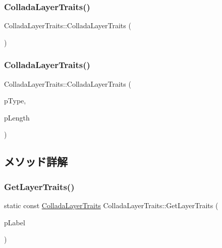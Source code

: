 \subsubsection{\texorpdfstring{Collada\+Layer\+Traits()}{ColladaLayerTraits()}\hspace{0.1cm}{\footnotesize\ttfamily [1/2]}}
{\footnotesize\ttfamily Collada\+Layer\+Traits\+::\+Collada\+Layer\+Traits (\begin{DoxyParamCaption}{ }\end{DoxyParamCaption})}

\mbox{\label{struct_collada_layer_traits_a823980f2de7a3b074c41add0b972fb78}} 
\subsubsection{\texorpdfstring{Collada\+Layer\+Traits()}{ColladaLayerTraits()}\hspace{0.1cm}{\footnotesize\ttfamily [2/2]}}
{\footnotesize\ttfamily Collada\+Layer\+Traits\+::\+Collada\+Layer\+Traits (\begin{DoxyParamCaption}\item[{\hyperlink{class_fbx_layer_element_a8c95c5cd880b56c776acd379bd86f42c}{Fbx\+Layer\+Element\+::\+E\+Type}}]{p\+Type,  }\item[{int}]{p\+Length }\end{DoxyParamCaption})}



\subsection{メソッド詳解}
\mbox{\label{struct_collada_layer_traits_ab540128a228dc27186beca5c5dd5f707}} 
\subsubsection{\texorpdfstring{Get\+Layer\+Traits()}{GetLayerTraits()}}
{\footnotesize\ttfamily static const \hyperlink{struct_collada_layer_traits}{Collada\+Layer\+Traits} Collada\+Layer\+Traits\+::\+Get\+Layer\+Traits (\begin{DoxyParamCaption}\item[{const \hyperlink{class_fbx_string}{Fbx\+String} \&}]{p\+Label }\end{DoxyParamCaption})\hspace{0.3cm}{\ttfamily [static]}}

